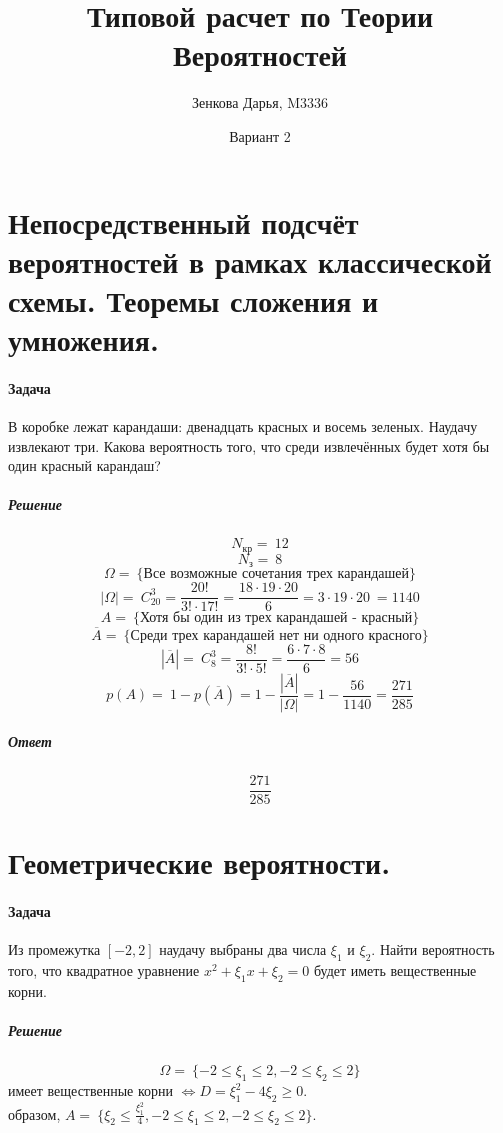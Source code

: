 \documentclass[fleqn, 10pt]{article}
\title{Типовой расчет по Теории Вероятностей}
\author{Зенкова Дарья, M3336}
\date{Вариант 2}
\newcommand\abs[1]{\left|#1\right|}
\begin{document}
\maketitle
\newpage
{}

\section{Непосредственный подсчёт вероятностей в рамках классической схемы. Теоремы сложения и умножения.}

\paragraph{Задача}
В коробке лежат карандаши: двенадцать красных и восемь зеленых. Наудачу извлекают три. Какова вероятность того, что среди извлечённых будет хотя бы один красный карандаш?
\subparagraph{Решение}
\[N_{\text{кр}} =\ 12\] 
\[N_{\text{з}} =\ 8\]
\[\Omega =\ \{\text{Все возможные сочетания трех карандашей}\}\]
\[\abs{\Omega} =\ C^3_{20} = \frac{20!}{3!\cdot17!} = \frac{18\cdot19\cdot20}{6} = 3\cdot19\cdot20\ = 1140 \]
\[A =\ \{\text{Хотя бы один из трех карандашей - красный}\} \]
\[\overline{A} =\ \{\text{Среди трех карандашей нет ни одного красного}\} \]
\[\abs{\overline{A}} =\ C^3_{8} = \frac{8!}{3!\cdot5!} = \frac{6\cdot7\cdot8}{6} = 56\]
\[p(A) =\ 1 - p(\overline{A}) = 1 - \frac{\abs{\overline{A}}}{\abs{\Omega}} = 1 - \frac{56}{1140} = \frac{271}{285}\]
\subparagraph{Ответ} \[\frac{271}{285}\]
\newpage

\section{Геометрические вероятности.}
\paragraph{Задача}
Из промежутка \({[{-2}, 2]}\) наудачу выбраны два числа \(\xi_1\) и \(\xi_2\). Найти вероятность того, что квадратное уравнение \(x^2+\xi_1x+\xi_2=0\) будет иметь вещественные корни.
\subparagraph{Решение}
\[\Omega =\ \{{-2}\leq\xi_1\leq2, {-2}\leq\xi_2\leq2\}\]
\indent{} имеет вещественные корни  \(\iff D = \xi_1^2 - 4\xi_2 \geq 0\). \\
\indent{} образом, \(A = \ \{\xi_2 \leq \frac{\xi_1^2}{4}, {-2}\leq\xi_1\leq2, {-2}\leq\xi_2\leq2\}\).\\
\end{document}
